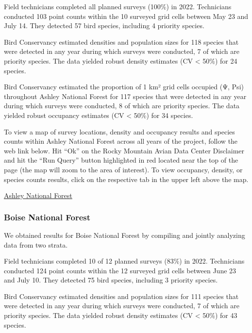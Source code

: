 \documentclass[
  letterpaper,
  DIV=11,
  numbers=noendperiod,
  oneside]{scrreprt}
\begin{document}
Field technicians completed all planned surveys (100\%) in 2022.
Technicians conducted 103 point counts within the 10 surveyed grid cells
between May 23 and July 14. They detected 57 bird species, including 4
priority species.

Bird Conservancy estimated densities and population sizes for 118
species that were detected in any year during which surveys were
conducted, 7 of which are priority species. The data yielded robust
density estimates (CV \textless{} 50\%) for 24 species.

Bird Conservancy estimated the proportion of 1 km² grid cells occupied
(Ψ, Psi) throughout Ashley National Forest for 117 species that were
detected in any year during which surveys were conducted, 8 of which are
priority species. The data yielded robust occupancy estimates (CV
\textless{} 50\%) for 34 species.

To view a map of survey locations, density and occupancy results and
species counts within Ashley National Forest across all years of the
project, follow the web link below. Hit ``Ok'' on the Rocky Mountain
Avian Data Center Disclaimer and hit the ``Run Query'' button
highlighted in red located near the top of the page (the map will zoom
to the area of interest). To view occupancy, density, or species counts
results, click on the respective tab in the upper left above the map.

\href{http://www.rmbo.org/new_site/adc/QueryWindow.aspx\#N4IgzgrgDgpgTmALnAhoiBbEAuABCAQTAAsAbGAT1wDk0BLAewDsVTcAxBuGJEAXyA==}{Ashley
National Forest}

\hypertarget{boise-national-forest}{%
\subsubsection{Boise National Forest}\label{boise-national-forest}}

We obtained results for Boise National Forest by compiling and jointly
analyzing data from two strata.

Field technicians completed 10 of 12 planned surveys (83\%) in 2022.
Technicians conducted 124 point counts within the 12 surveyed grid cells
between June 23 and July 10. They detected 75 bird species, including 3
priority species.

Bird Conservancy estimated densities and population sizes for 111
species that were detected in any year during which surveys were
conducted, 7 of which are priority species. The data yielded robust
density estimates (CV \textless{} 50\%) for 43 species.
\end{document}
